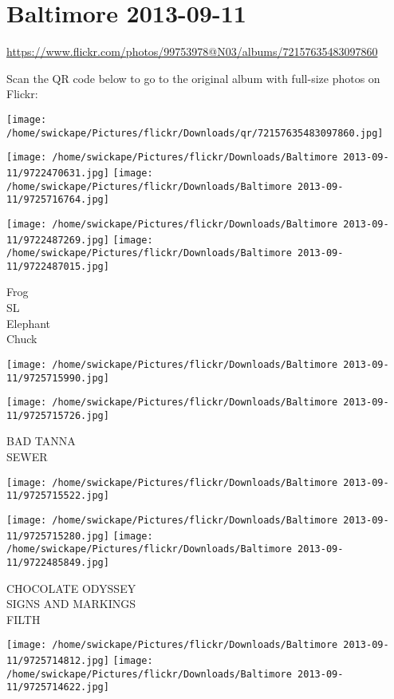 \documentclass[10pt,letterpaper]{article}
\title{}
\author{}
\date{}
\begin{document}
\section*{Baltimore 2013-09-11}

\url{https://www.flickr.com/photos/99753978@N03/albums/72157635483097860}

Scan the QR code below to go to the original album with full-size photos on Flickr:

\texttt{[image: /home/swickape/Pictures/flickr/Downloads/qr/72157635483097860.jpg]}
\pagebreak

\texttt{[image: /home/swickape/Pictures/flickr/Downloads/Baltimore 2013-09-11/9722470631.jpg]}
\texttt{[image: /home/swickape/Pictures/flickr/Downloads/Baltimore 2013-09-11/9725716764.jpg]}

\texttt{[image: /home/swickape/Pictures/flickr/Downloads/Baltimore 2013-09-11/9722487269.jpg]}
\texttt{[image: /home/swickape/Pictures/flickr/Downloads/Baltimore 2013-09-11/9722487015.jpg]}

Frog\\
SL\\
Elephant\\
Chuck
\pagebreak

\texttt{[image: /home/swickape/Pictures/flickr/Downloads/Baltimore 2013-09-11/9725715990.jpg]}

\vspace{0.25in}
\texttt{[image: /home/swickape/Pictures/flickr/Downloads/Baltimore 2013-09-11/9725715726.jpg]}

BAD TANNA\\
SEWER
\pagebreak

\texttt{[image: /home/swickape/Pictures/flickr/Downloads/Baltimore 2013-09-11/9725715522.jpg]}

\vspace{0.25in}
\texttt{[image: /home/swickape/Pictures/flickr/Downloads/Baltimore 2013-09-11/9725715280.jpg]}
\texttt{[image: /home/swickape/Pictures/flickr/Downloads/Baltimore 2013-09-11/9722485849.jpg]}

CHOCOLATE ODYSSEY\\
SIGNS AND MARKINGS\\
FILTH
\pagebreak

\texttt{[image: /home/swickape/Pictures/flickr/Downloads/Baltimore 2013-09-11/9725714812.jpg]}
\texttt{[image: /home/swickape/Pictures/flickr/Downloads/Baltimore 2013-09-11/9725714622.jpg]}
\end{document}
